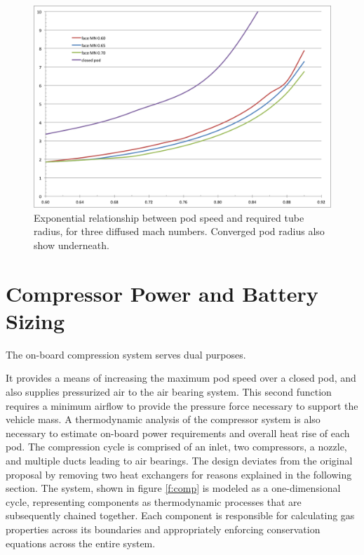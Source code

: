 \documentclass[heading.tex]{subfiles}
\begin{document}
\begin{figure}[H]
\centering
\includegraphics[width=\textwidth]{images/mach_vs_rad4.png}
\caption[Tube and Pod Radius vs Mach]{Exponential relationship between pod speed and required tube radius, for three diffused mach numbers.
Converged pod radius also show underneath. }
\label{f:machRAD}
\end{figure}


\section{Compressor Power and Battery Sizing}
\label{sec:compressor-and-battery}

The on-board compression system serves dual purposes.

It provides a means of increasing the maximum pod speed over a closed pod, and also supplies pressurized air to the air bearing system. This second function requires a minimum airflow to provide the pressure force necessary to support the vehicle mass.
A thermodynamic analysis of the compressor system is also necessary to
estimate on-board power requirements and overall heat rise of each pod.
The compression cycle is comprised of an inlet, two compressors, a nozzle, and multiple ducts leading to air bearings.
The design deviates from the original proposal by removing two heat exchangers for reasons explained in the following section.
The system, shown in figure \ref{f:comp} is modeled as a one-dimensional cycle,
representing components as thermodynamic processes that are subsequently chained together.
Each component is responsible for calculating gas properties across its boundaries
and appropriately enforcing conservation equations across the entire system.
\end{document}
